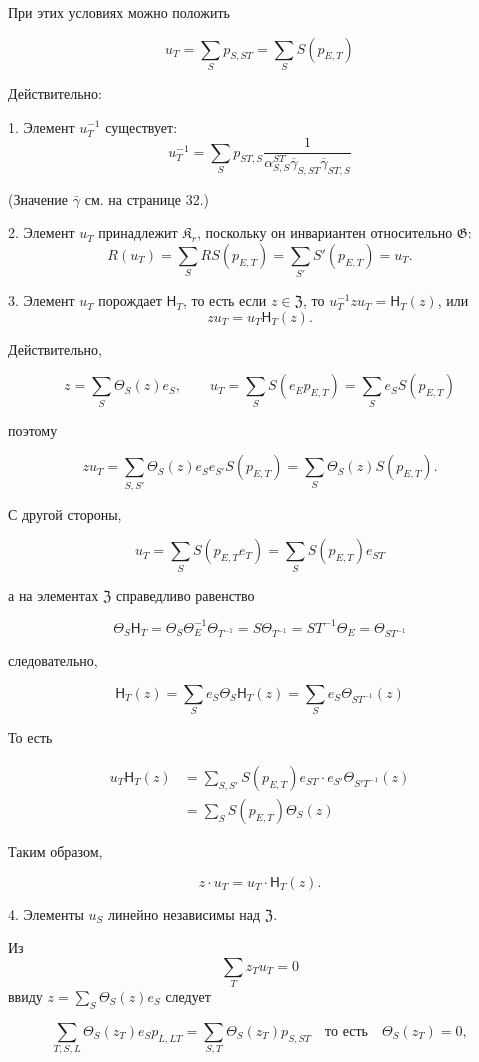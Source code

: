 \documentclass[11pt]{article}
\begin{document}
При этих условиях можно положить

\[
u_T=\sum_S p_{S,ST}=\sum_S S(p_{E,T})
\]

Действительно:

1. Элемент \(u_T^{-1}\) существует:
\[
u_T^{-1}=\sum_S p_{ST,S}
\frac{1}{\alpha_{S,S}^{ST}\overline{\gamma}_{S,ST}\overline{\gamma}_{ST,S}}
\]

(Значение \(\bar{\gamma}\) см. на странице 32.)

2. Элемент \(u_T\) принадлежит \(\mathfrak K_r\), поскольку он инвариантен относительно \(\mathfrak G\):
\[
R(u_T)=\sum_S RS(p_{E,T})=\sum_{S'} S'(p_{E,T})=u_T.
\]

3. Элемент \(u_T\) порождает \(\mathsf{H}_T\), то есть если \(z\in\mathfrak Z\), то \(u_T^{-1}zu_T=\mathsf{H}_T(z)\), или
\[
z u_T=u_T \mathsf{H}_T(z).
\]

Действительно,

\[
z=\sum_S\Theta_S(z)e_S,\qquad
u_T=\sum_S S(e_Ep_{E,T})=\sum_S e_S S(p_{E,T})
\]

поэтому

\[
zu_T=\sum_{S,S'}\Theta_S(z)e_Se_{S'}S(p_{E,T})
=\sum_S\Theta_S(z)S(p_{E,T}).
\]

С другой стороны,

\[
u_T=\sum_S S(p_{E,T}e_T)=\sum_S S(p_{E,T})e_{ST}
\]

а на элементах \(\mathfrak Z\) справедливо равенство

\[
\Theta_S \mathsf{H}_T=\Theta_S\Theta_E^{-1}\Theta_{T^{-1}}
=S\Theta_{T^{-1}}=ST^{-1}\Theta_E=\Theta_{ST^{-1}}
\]

следовательно,

\[
\mathsf{H}_T(z)=\sum_S e_S\Theta_S \mathsf{H}_T(z)=\sum_S e_S\Theta_{ST^{-1}}(z)
\]

То есть

\[
\begin{aligned}
u_T\mathsf{H}_T(z)
&=\sum_{S,S'} S(p_{E,T})e_{ST}\cdot e_{S'}\Theta_{S'T^{-1}}(z)\\
&=\sum_S S(p_{E,T})\Theta_S(z)
\end{aligned}
\]

Таким образом,

\[
z\cdot u_T=u_T\cdot \mathsf{H}_T(z).
\]

4. Элементы \(u_S\) линейно независимы над \(\mathfrak Z\).

Из
\[
\sum_T z_Tu_T=0
\]
ввиду \(z=\sum_S\Theta_S(z)e_S\) следует

\[
\sum_{T,S,L}\Theta_S(z_T)e_Sp_{L,LT}
=\sum_{S,T}\Theta_S(z_T)p_{S,ST}\quad\text{то есть}\quad
\Theta_S(z_T)=0,
\]
\end{document}

